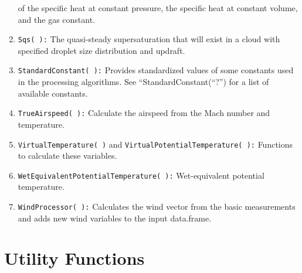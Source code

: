 \documentclass[12pt,english]{report}\usepackage[]{graphicx}\usepackage[]{color}
\begin{document}
\begin{enumerate}
of the specific heat at constant pressure, the specific heat at constant
volume, and the gas constant.
\item \texttt{Sqs( ):} The quasi-steady supersaturation that will exist
in a cloud with specified droplet size distribution and updraft.
\item \texttt{StandardConstant( ):} Provides standardized values of some
constants used in the processing algorithms. See ``StandardConstant(``?'')
for a list of available constants.
\item \texttt{TrueAirspeed( ):} Calculate the airspeed from the Mach number
and temperature.
\item \texttt{VirtualTemperature( )} and \texttt{VirtualPotentialTemperature(
):} Functions to calculate these variables.
\item \texttt{WetEquivalentPotentialTemperature( ):} Wet-equivalent potential
temperature.
\item \texttt{WindProcessor( ):} Calculates the wind vector from the basic
measurements and adds new wind variables to the input data.frame.
\end{enumerate}

\section{Utility Functions}
\end{document}
